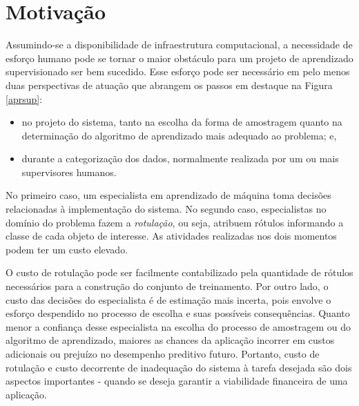 \section{Motivação}\label{motiv}
Assumindo-se a disponibilidade de infraestrutura computacional, a necessidade de esforço humano pode se tornar o maior obstáculo para um projeto de aprendizado supervisionado ser bem sucedido.
Esse esforço pode ser necessário em pelo menos duas perspectivas de atuação que abrangem os passos em destaque na Figura \ref{aprsup}:
\begin{itemize}
\item no projeto do sistema, tanto na escolha da forma de {amostragem} quanto na determinação do algoritmo de {aprendizado} mais adequado ao problema; e,
\item durante a {categorização} dos dados, normalmente realizada por um ou mais supervisores humanos.
\end{itemize}
No primeiro caso, um especialista em aprendizado de máquina toma decisões relacionadas à implementação do sistema.
No segundo caso, especialistas no domínio do problema fazem a \textit{rotulação}, ou seja, atribuem rótulos informando a classe de cada objeto de interesse.
As atividades realizadas nos dois momentos podem ter um custo elevado.

O custo de rotulação pode ser facilmente contabilizado pela quantidade de rótulos necessários para a construção do conjunto de treinamento.
Por outro lado, o custo das decisões do especialista é de estimação mais incerta, pois envolve o esforço despendido no processo de escolha e suas possíveis consequências.
Quanto menor a confiança desse especialista na escolha do processo de amostragem ou do algoritmo de aprendizado, maiores as chances da aplicação incorrer em custos adicionais ou prejuízo no desempenho preditivo futuro.
Portanto, custo de rotulação e custo decorrente de inadequação do sistema à tarefa desejada são dois aspectos importantes - quando se deseja garantir a viabilidade financeira de uma aplicação.


